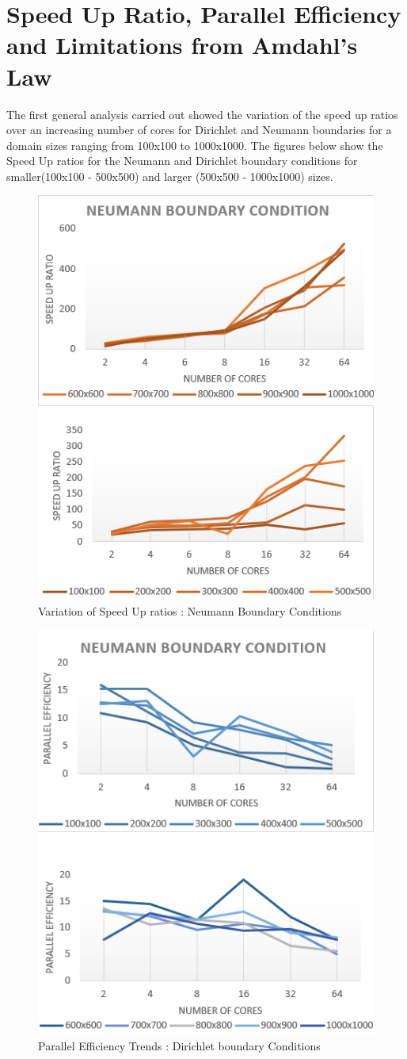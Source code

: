 \documentclass[twoside,twocolumn]{article}
\begin{document}
\section{Speed Up Ratio, Parallel Efficiency and Limitations from Amdahl's Law}
The first general analysis carried out showed the variation of the speed up ratios over an increasing number of cores for Dirichlet and Neumann boundaries for a domain sizes ranging from 100x100 to 1000x1000. The figures below show the Speed Up ratios for the Neumann and Dirichlet boundary conditions for smaller(100x100 - 500x500) and larger (500x500 - 1000x1000) sizes.\\

\vspace{-4mm}
\begin{figure}[h]
\centering
\includegraphics[height=10.5 cm\textwidth]{images/sppedupratios-neumann.png}
\caption{Variation of Speed Up ratios : Neumann Boundary Conditions}
\end{figure}

\begin{figure}[H]
\centering
\includegraphics[height=10.5 cm\textwidth]{images/PARALLEL EFFICIENCY NEWMANN.png}
\caption{Parallel Efficiency Trends : Dirichlet boundary Conditions}
\end{figure}
\end{document}
